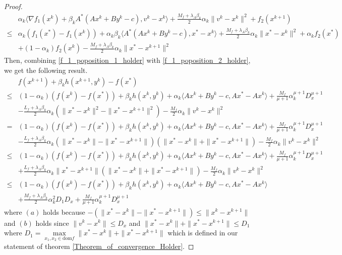 \documentclass{article}
\numberwithin{equation}{section}
\begin{document}
\begin{proof}
    \begin{align}
        &\alpha_k\langle \nabla f_1(x^k)+\beta_kA^*(Ax^k+By^k-c), v^k -x^k\rangle + \frac{M_f+\lambda_{A} \beta_{k}}{2}\alpha_k\|v^k - x^{k}\rVert^{2} + f_2(x^{k+1}) \nonumber \\
        \leq& \alpha_k (f_1(x^*)-f_1(x^k))+ \alpha_k\beta_k\langle  A^*(Ax^k+By^k-c), x^* -x^k\rangle + \frac{M_f+\lambda_{A} \beta_{k}}{2}\alpha_k\|x^* - x^{k}\rVert^2 + \alpha_k f_2(x^*)  \nonumber \\
        & +(1-\alpha_k)f_2(x^k)-\frac{M_f+\lambda_{A} \beta_{k}}{2}\alpha_k\|x^* - x^{k+1}\rVert^2\label{f_1_poposition_2_holder}
    \end{align}
    Then, combining \eqref{f_1_poposition_1_holder} with \eqref{f_1_poposition_2_holder}, we get the following result.
    \begin{align}
         &f(x^{k+1})+ \beta_{k}h(x^{k+1},y^k) -f(x^*) \nonumber \\
         \leq& (1-\alpha_k)(f(x^k) -f(x^*)) +\beta_{k}h(x^k,y^k)+\alpha_k\langle Ax^k+By^k-c,Ax^*-Ax^k\rangle +\frac{M_f}{\mu+1}\alpha_k^{\mu +1}D_x^{\mu+1} \nonumber \\
         & -\frac{L_f+\lambda_{A} \beta_{k}}{2}\alpha_k\left(\|x^* - x^{k}\rVert^2 -  \|x^* - x^{k+1}\rVert^2\right) -\frac{M_f}{2}\alpha_k\|v^k-x^k\rVert^2 \nonumber \\
         =& (1-\alpha_k)(f(x^k) -f(x^*)) +\beta_{k}h(x^k,y^k)+\alpha_k\langle Ax^k+By^k-c,Ax^*-Ax^k\rangle +\frac{M_f}{\mu+1}\alpha_k^{\mu +1}D_x^{\mu+1} \nonumber \\
         & -\frac{L_f+\lambda_{A} \beta_{k}}{2}\alpha_k\left(\|x^* - x^{k}\rVert -  \|x^* - x^{k+1}\rVert\right)\left(\|x^* - x^{k}\rVert + \|x^* - x^{k+1}\rVert\right) -\frac{M_f}{2}\alpha_k\|v^k-x^k\rVert^2 \nonumber \\
         \overset{\mathop{(a)}}{\leq}& (1-\alpha_k)(f(x^k) -f(x^*)) +\beta_{k}h(x^k,y^k)+\alpha_k\langle Ax^k+By^k-c,Ax^*-Ax^k\rangle +\frac{M_f}{\mu+1}\alpha_k^{\mu +1}D_x^{\mu+1} \nonumber \\
         & +\frac{L_f+\lambda_{A} \beta_{k}}{2}\alpha_k\|x^*  - x^{k+1}\rVert\left(\|x^* - x^{k}\rVert + \|x^* - x^{k+1}\rVert\right) -\frac{M_f}{2}\alpha_k\|v^k-x^k\rVert^2 \nonumber \\
         \overset{\mathop{(b)}}{\leq}& (1-\alpha_k)(f(x^k) -f(x^*)) +\beta_{k}h(x^k,y^k)+\alpha_k\langle Ax^k+By^k-c,Ax^*-Ax^k\rangle  \nonumber \\
         &+\frac{M_f+\lambda_{A} \beta_k}{2}\alpha_k^2D_1D_x + \frac{M_f}{\mu+1}\alpha_k^{\mu +1}D_x^{\mu+1}
         \label{f_k+1_holder}
    \end{align}
    where $(a)$ holds because $-\left(\|x^* - x^k\rVert - \|x^* - x^{k+1}\rVert\right) \leq \|x^k-x^{k+1}\rVert$ 
    and $(b)$ holds since  $\|v^k -x^k\rVert \leq D_x$ and $ \|x^* - x^k\rVert +\|x^* -x^{k+1}\rVert \leq D_1$ 
    where $D_1 = \max\limits_{x_1,x_2\in\mathrm{dom}f}\|x^* - x^k\rVert+ \|x^*-x^{k+1}\rVert$ which is 
    defined in our statement of theorem \ref{Theorem_of_convergence_Holder}. 


\end{proof}
\end{document}
